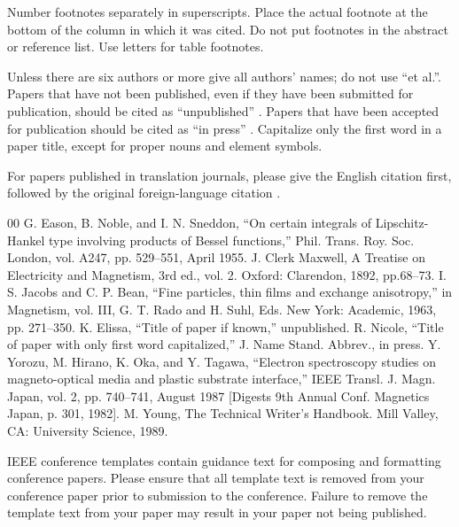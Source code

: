 \documentclass[conference]{IEEEtran}
\begin{document}
Number footnotes separately in superscripts. Place the actual footnote at 
the bottom of the column in which it was cited. Do not put footnotes in the 
abstract or reference list. Use letters for table footnotes.

Unless there are six authors or more give all authors' names; do not use 
``et al.''. Papers that have not been published, even if they have been 
submitted for publication, should be cited as ``unpublished'' \cite{b4}. Papers 
that have been accepted for publication should be cited as ``in press'' \cite{b5}. 
Capitalize only the first word in a paper title, except for proper nouns and 
element symbols.

For papers published in translation journals, please give the English 
citation first, followed by the original foreign-language citation \cite{b6}.

\begin{thebibliography}{00}
 G. Eason, B. Noble, and I. N. Sneddon, ``On certain integrals of Lipschitz-Hankel type involving products of Bessel functions,'' Phil. Trans. Roy. Soc. London, vol. A247, pp. 529--551, April 1955.
 J. Clerk Maxwell, A Treatise on Electricity and Magnetism, 3rd ed., vol. 2. Oxford: Clarendon, 1892, pp.68--73.
 I. S. Jacobs and C. P. Bean, ``Fine particles, thin films and exchange anisotropy,'' in Magnetism, vol. III, G. T. Rado and H. Suhl, Eds. New York: Academic, 1963, pp. 271--350.
 K. Elissa, ``Title of paper if known,'' unpublished.
 R. Nicole, ``Title of paper with only first word capitalized,'' J. Name Stand. Abbrev., in press.
 Y. Yorozu, M. Hirano, K. Oka, and Y. Tagawa, ``Electron spectroscopy studies on magneto-optical media and plastic substrate interface,'' IEEE Transl. J. Magn. Japan, vol. 2, pp. 740--741, August 1987 [Digests 9th Annual Conf. Magnetics Japan, p. 301, 1982].
 M. Young, The Technical Writer's Handbook. Mill Valley, CA: University Science, 1989.
\end{thebibliography}
\vspace{12pt}
\color{red}
IEEE conference templates contain guidance text for composing and formatting conference papers. Please ensure that all template text is removed from your conference paper prior to submission to the conference. Failure to remove the template text from your paper may result in your paper not being published.
\end{document}
